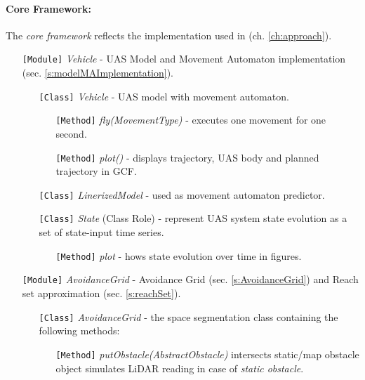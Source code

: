 \paragraph{Core Framework:} The \emph{core framework} reflects the implementation used in (ch. \ref{ch:approach}).
\begin{itemize}
    \item[\texttt{[Module]}] \emph{Vehicle} - UAS Model and Movement Automaton implementation (sec. \ref{s:modelMAImplementation}).
    \begin{itemize}
        \item[\texttt{[Class]}] \emph{Vehicle} - UAS model with movement automaton.
        \begin{itemize}
            \item[\texttt{[Method]}] \emph{fly(MovementType)} - executes one movement for one second.
            \item[\texttt{[Method]}] \emph{plot()} - displays trajectory, UAS body and planned trajectory in GCF.
        \end{itemize}
        
        \item[\texttt{[Class]}] \emph{LinerizedModel} - used as movement automaton predictor. 
        
        \item[\texttt{[Class]}] \emph{State} (Class Role) - represent UAS system state evolution as a set of state-input time series.        
        \begin{itemize}
            \item[\texttt{[Method]}] \emph{plot} - hows state evolution over time in figures.
        \end{itemize}
    \end{itemize}
    
    
    \item[\texttt{[Module]}] \emph{AvoidanceGrid} - Avoidance Grid (sec. \ref{s:AvoidanceGrid}) and Reach set approximation (sec. \ref{s:reachSet}).
    
     \begin{itemize}
        \item[\texttt{[Class]}] \emph{AvoidanceGrid} - the space segmentation class containing the following methods:
        \begin{itemize}
            \item[\texttt{[Method]}] \emph{putObstacle(AbstractObstacle)} intersects static/map obstacle object simulates LiDAR reading in case of \emph{static obstacle}.
            

\end{itemize}
\end{itemize}
\end{itemize}

